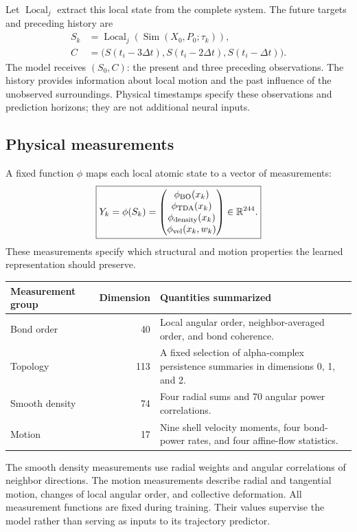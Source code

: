 \documentclass[11pt,a4paper]{article}
\numberwithin{equation}{section}
\newcommand{\R}{\mathbb R}
\newcommand{\Sim}{\operatorname{Sim}}
\newcommand{\Local}{\operatorname{Local}}
\newcommand{\vel}{\mathrm{vel}}
\begin{document}
Let $\Local_j$ extract this local state from the complete system. The future
targets and preceding history are
\begin{align}
S_k&=\Local_j\!\left(\Sim(X_0,P_0;\tau_k)\right),\\
C&=\bigl(S(t_i-3\Delta t),S(t_i-2\Delta t),S(t_i-\Delta t)\bigr).
\end{align}
The model receives $(S_0,C)$: the present and three preceding observations.
The history provides information about local motion and the past influence
of the unobserved surroundings. Physical timestamps specify these observations
and prediction horizons; they are not additional neural inputs.

\subsection{Physical measurements}

A fixed function $\phi$ maps each local atomic state to a vector of measurements:
\begin{equation}
\boxed{
Y_k=\phi(S_k)=
\begin{pmatrix}
\phi_{\rm BO}(x_k)\\
\phi_{\rm TDA}(x_k)\\
\phi_{\rm density}(x_k)\\
\phi_{\vel}(x_k,w_k)
\end{pmatrix}\in\R^{244}.}
\label{eq:phi}
\end{equation}
These measurements specify which structural and motion properties the learned
representation should preserve.
\begin{center}
\small
\begin{tabularx}{\linewidth}{@{}l r X@{}}
\toprule
Measurement group & Dimension & Quantities summarized\\
\midrule
Bond order & 40 & Local angular order, neighbor-averaged order, and bond coherence.\\
Topology & 113 & A fixed selection of alpha-complex persistence summaries in dimensions 0, 1, and 2.\\
Smooth density & 74 & Four radial sums and 70 angular power correlations.\\
Motion & 17 & Nine shell velocity moments, four bond-power rates, and four affine-flow statistics.\\
\bottomrule
\end{tabularx}
\end{center}
The smooth density measurements use radial weights and angular correlations
of neighbor directions. The motion measurements describe radial and tangential
motion, changes of local angular order, and collective deformation. All
measurement functions are fixed during training. Their values supervise the
model rather than serving as inputs to its trajectory predictor.
\end{document}
